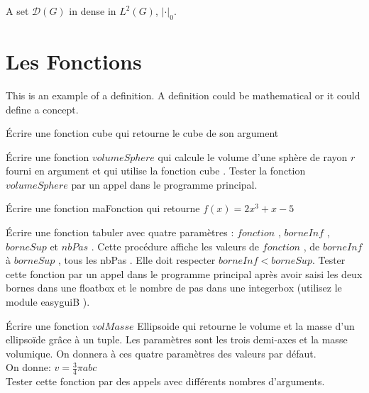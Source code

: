 \documentclass[11pt,fleqn]{book} %
\begin{document}
\begin{exercise}
A set $\mathcal{D}(G)$ in dense in $L^2(G)$, $|\cdot|_0$. 
\end{exercise}
\begin{solution}
\end{solution}

\section{Les Fonctions}

This is an example of a definition. A definition could be mathematical or it could define a concept.

\begin{exercise}
Écrire une fonction cube qui retourne le cube de son argument
\end{exercise}

\begin{exercise}
Écrire une fonction $volumeSphere$ qui calcule le volume d’une sphère de rayon $r$ fourni
en argument et qui utilise la fonction cube .
Tester la fonction $volumeSphere$ par un appel dans le programme principal.
\end{exercise}

\begin{exercise}
Écrire une fonction maFonction qui retourne $f(x) = 2x^{3} + x - 5$
\end{exercise}

\begin{exercise}
Écrire une fonction tabuler avec quatre paramètres : $fonction$ , $borneInf$ , $borneSup$
et $nbPas$ . Cette procédure affiche les valeurs de $fonction$ , de $borneInf$ à $borneSup$ ,
tous les nbPas . Elle doit respecter $borneInf < borneSup$.
Tester cette fonction par un appel dans le programme principal après avoir saisi les
deux bornes dans une floatbox et le nombre de pas dans une integerbox (utilisez le
module easyguiB ).
\end{exercise}

\begin{exercise}
Écrire une fonction $volMasse$ Ellipsoide qui retourne le volume et la masse d’un ellipsoïde grâce à un tuple. Les paramètres sont les trois demi-axes et la masse volumique. On donnera à ces quatre paramètres des valeurs par défaut. \\
On donne: $v = \frac{3}{4} \pi abc$ \\
Tester cette fonction par des appels avec différents nombres d’arguments.
\end{exercise}
\end{document}
